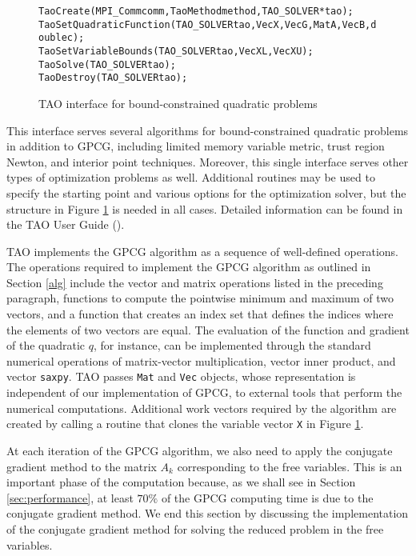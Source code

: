 \documentclass{esub2acm}
\begin{document}
\begin{figure}[htb]
\medskip
\begin{alltt}
  TaoCreate(MPI_Comm comm,TaoMethod method,TAO_SOLVER *tao); 
  TaoSetQuadraticFunction(TAO_SOLVER tao,Vec X,Vec G,Mat A,Vec B,double c);
  TaoSetVariableBounds(TAO_SOLVER tao,Vec XL,Vec XU);
  TaoSolve(TAO_SOLVER tao);
  TaoDestroy(TAO_SOLVER tao);
\end{alltt}
\caption{TAO interface for bound-constrained quadratic problems\label{tao_interface}}
\end{figure}

This interface serves
several algorithms for bound-constrained quadratic problems in
addition to GPCG, including limited memory variable metric, trust
region Newton, and interior point techniques.  Moreover, this single
interface serves other types of optimization problems as well.
Additional routines may be used to specify the starting point
and various options for the optimization solver,
but the structure in  Figure \ref{tao_interface} is needed in all cases.
Detailed information can be found
in the TAO User Guide ().

TAO implements the GPCG algorithm as a sequence of well-defined operations.
The operations required to implement the GPCG algorithm as outlined
in Section \ref{alg} include
the vector and matrix operations listed in the preceding paragraph,
functions to compute
the pointwise minimum and maximum of two vectors,
and a function that creates an
index set that defines the indices where the elements
of two vectors are equal.
The evaluation of the function and gradient of
the quadratic $q$,
for instance, can be implemented through the standard
numerical operations of matrix-vector 
multiplication, vector inner product, and vector \texttt{saxpy}.
TAO passes \texttt{Mat} and \texttt{Vec} objects, whose
representation is independent of our implementation of GPCG, to 
external tools
that perform the numerical computations.
Additional work vectors required by the algorithm 
are created by calling a routine that
clones the variable vector \texttt{X} in Figure \ref{tao_interface}.


At each iteration of the GPCG algorithm, we also need to apply
the conjugate gradient method to the matrix $ A_k $ corresponding
to the free variables.
This is an important phase of the computation because,
as we shall see in Section \ref{sec:performance}, at least $70\%$ of
the GPCG computing time is due to the conjugate gradient method.
We end this section by discussing the implementation of
the conjugate gradient method for solving the
reduced problem in the free variables.
\end{document}

